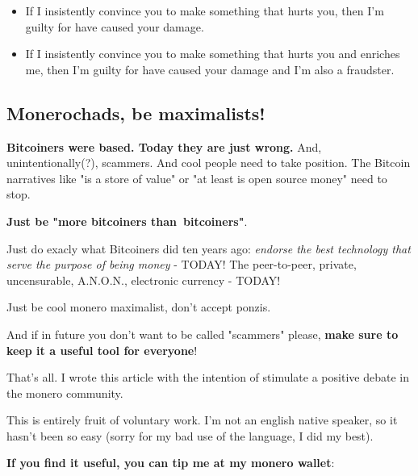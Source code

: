 \documentclass{article}
\begin{document}
\begin{itemize}

	\item If I insistently convince you to make something that hurts you, then I'm guilty for have caused your damage.
	\item If I insistently convince you to make something that hurts you and enriches me, then I'm guilty for have caused your damage and I'm also a fraudster.\vspace{0.2cm}

\end{itemize}


\subsection{Monerochads, be maximalists!}


\textbf{Bitcoiners were based. Today they are just wrong.} And, unintentionally(?), scammers. And cool people need to take position. The Bitcoin narratives like "is a store of value" or "at least is open source money" need to stop.\vspace{0.5cm}


\textbf{Just be "more bitcoiners than bitcoiners"}.\vspace{0.3cm}

Just do exacly what Bitcoiners did ten years ago: \emph{endorse the best technology that serve the purpose of being money} - TODAY! The peer-to-peer, private, uncensurable, A.N.O.N., electronic currency - TODAY!

Just be cool monero maximalist, don't accept ponzis.\vspace{0.2cm}


And if in future you don't want to be called "scammers" please, \textbf{make sure to keep it a useful tool for everyone}!\vspace{3cm}

That's all. I wrote this article with the intention of stimulate a positive debate in the monero community.\vspace{0.2cm}

This is entirely fruit of voluntary work. I'm not an english native speaker, so it hasn't been so easy (sorry for my bad use of the language, I did my best). \vspace{0.5cm}

\hspace{0.3cm}\textbf{If you find it useful, you can tip me at my monero wallet}:\vspace{0.3cm}
\end{document}
